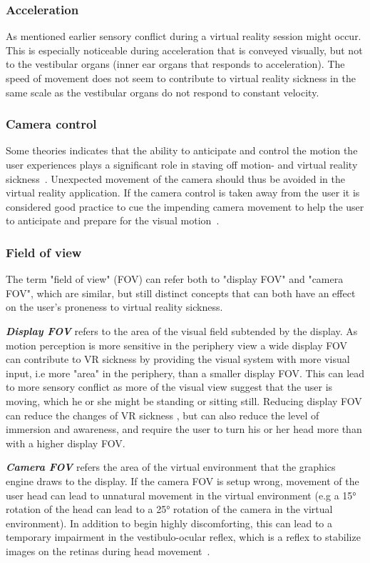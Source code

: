 \subsubsection{Acceleration}
As mentioned earlier sensory conflict during a virtual reality session might occur. This is especially noticeable during acceleration that is conveyed visually, but 
not to the vestibular organs (inner ear organs that responds to acceleration). The speed of movement does not seem to contribute to virtual reality sickness in the same scale
as the vestibular organs do not respond to constant velocity. %

\subsubsection{Camera control}
Some theories indicates that the ability to anticipate and control the motion the user experiences plays a significant role in staving off motion- 
and virtual reality sickness~\citep{Rolnick1991}. Unexpected movement of the camera should thus be avoided in the virtual reality application. 
If the camera control is taken away from the user it is considered good practice to cue the impending camera movement to help the user to anticipate and prepare for 
the visual motion~\citep{Lin2004}.

\subsubsection{Field of view}
The term "field of view" (FOV) can refer both to "display FOV" and "camera FOV", which are similar, 
but still distinct concepts that can both have an effect on the user's proneness to virtual reality sickness. 

\textbf{\textit{Display FOV}} refers to the area of the visual field subtended by the display. As motion perception is more sensitive in the periphery view 
a wide display FOV can contribute to VR sickness by providing the visual system with more visual input, i.e more "area" in the periphery, than a smaller display FOV. 
This can lead to more sensory conflict as more of the visual view suggest that the user is moving, which he or she might be standing or sitting still.
Reducing display FOV can reduce the changes of VR sickness \citep{Draper2001}, but can also reduce the level of immersion and awareness, and require the user to turn his or her head more
than with a higher display FOV.

\textbf{\textit{Camera FOV}} refers the area of the virtual environment that the graphics engine draws to the display.
If the camera FOV is setup wrong, movement of the user head can lead to unnatural movement in the virtual environment (e.g a 15° rotation of the head can lead to a 
25° rotation of the camera in the virtual environment). In addition to begin highly discomforting, this can lead to a temporary impairment in the vestibulo-ocular reflex, 
which is a reflex to stabilize images on the retinas during head movement~\citep{Stanney2002}.

